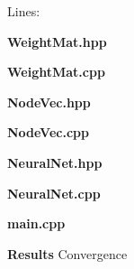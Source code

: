 \documentclass[14pt]{article}
\begin{document}
\begin{flushleft}
Lines:

\immediate{}



	\textbf{WeightMat.hpp}

	\textbf{WeightMat.cpp}


	\newpage
	\textbf{NodeVec.hpp}

	\textbf{NodeVec.cpp}


	\newpage
	\textbf{NeuralNet.hpp}

	\textbf{NeuralNet.cpp}


	\newpage
	\textbf{main.cpp}

	\textbf{Results}
	Convergence 


\end{flushleft}
\end{document}
